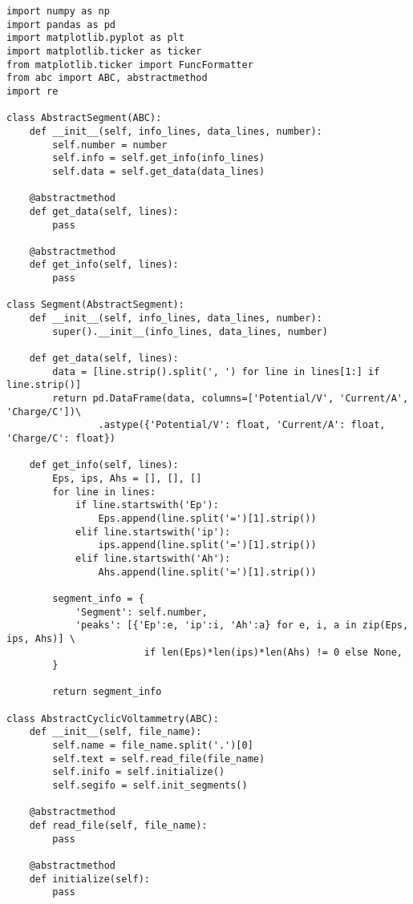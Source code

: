 \begin{verbatim}
import numpy as np
import pandas as pd
import matplotlib.pyplot as plt
import matplotlib.ticker as ticker
from matplotlib.ticker import FuncFormatter
from abc import ABC, abstractmethod
import re

class AbstractSegment(ABC):
    def __init__(self, info_lines, data_lines, number):
        self.number = number
        self.info = self.get_info(info_lines)
        self.data = self.get_data(data_lines)
    
    @abstractmethod
    def get_data(self, lines):
        pass
    
    @abstractmethod
    def get_info(self, lines):
        pass

class Segment(AbstractSegment):
    def __init__(self, info_lines, data_lines, number):
        super().__init__(info_lines, data_lines, number)

    def get_data(self, lines):
        data = [line.strip().split(', ') for line in lines[1:] if line.strip()]
        return pd.DataFrame(data, columns=['Potential/V', 'Current/A', 'Charge/C'])\
                .astype({'Potential/V': float, 'Current/A': float, 'Charge/C': float})

    def get_info(self, lines):
        Eps, ips, Ahs = [], [], []
        for line in lines:
            if line.startswith('Ep'):
                Eps.append(line.split('=')[1].strip())
            elif line.startswith('ip'):
                ips.append(line.split('=')[1].strip())
            elif line.startswith('Ah'):
                Ahs.append(line.split('=')[1].strip())

        segment_info = {
            'Segment': self.number,
            'peaks': [{'Ep':e, 'ip':i, 'Ah':a} for e, i, a in zip(Eps, ips, Ahs)] \
                        if len(Eps)*len(ips)*len(Ahs) != 0 else None,
        }

        return segment_info

class AbstractCyclicVoltammetry(ABC):
    def __init__(self, file_name):
        self.name = file_name.split('.')[0]
        self.text = self.read_file(file_name)
        self.inifo = self.initialize()
        self.segifo = self.init_segments()

    @abstractmethod
    def read_file(self, file_name):
        pass

    @abstractmethod
    def initialize(self):
        pass


\end{verbatim}
